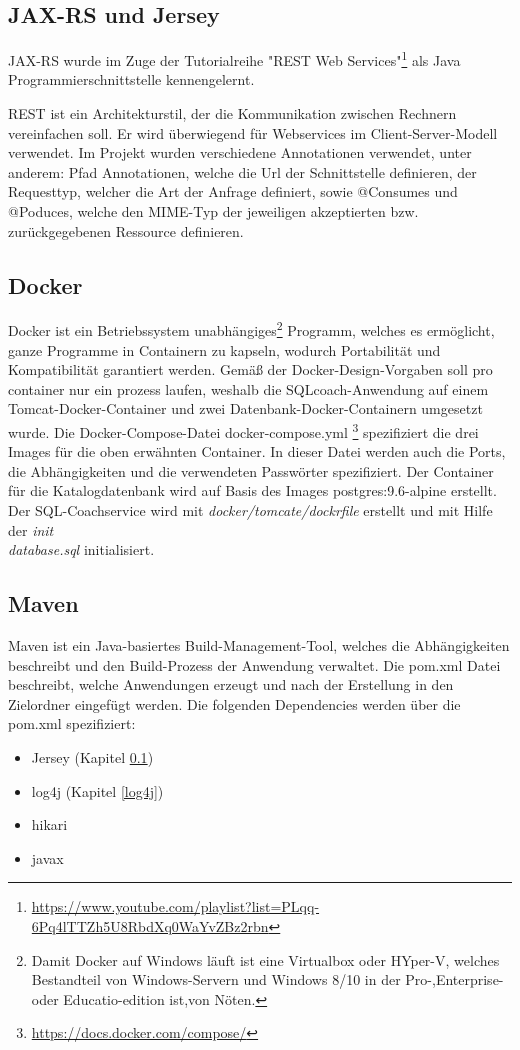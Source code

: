 \documentclass[fleqn,10pt,ngerman]{SelfArx}
\begin{document}
	
	\subsection{JAX-RS und Jersey}\label{JAX-RS und Jersey}
	JAX-RS wurde im Zuge der Tutorialreihe "REST Web Services"\footnote{\url{https://www.youtube.com/playlist?list=PLqq-6Pq4lTTZh5U8RbdXq0WaYvZBz2rbn}} als Java Programmierschnittstelle kennengelernt.
	
	\noindent REST ist ein Architekturstil, der die Kommunikation zwischen Rechnern vereinfachen soll.
	Er wird überwiegend für Webservices im Client-Server-Modell verwendet.
	Im Projekt wurden verschiedene Annotationen verwendet, unter anderem:\newline
	Pfad Annotationen, welche die Url der Schnittstelle definieren, der Requesttyp, welcher die Art der Anfrage definiert, sowie @Consumes und @Poduces, welche den MIME-Typ der jeweiligen akzeptierten bzw. zurückgegebenen Ressource definieren.
	\subsection{Docker}
	Docker  ist ein Betriebssystem unabhängiges\footnote{Damit Docker auf Windows läuft ist eine Virtualbox oder HYper-V, welches Bestandteil von Windows-Servern und Windows 8/10 in der Pro-,Enterprise- oder Educatio-edition ist,von Nöten.} Programm, welches es ermöglicht, ganze Programme in Containern zu kapseln, wodurch Portabilität und Kompatibilität garantiert werden. 
	Gemäß der Docker-Design-Vorgaben soll pro container nur ein prozess laufen, weshalb die SQLcoach-Anwendung auf einem Tomcat-Docker-Container und zwei Datenbank-Docker-Containern umgesetzt wurde. \newline
	Die Docker-Compose-Datei  docker-compose.yml \footnote{\url{https://docs.docker.com/compose/}}
	spezifiziert die drei Images für die  oben erwähnten Container. In dieser Datei werden auch die Ports, die Abhängigkeiten und die verwendeten Passwörter spezifiziert.
	Der Container für die Katalogdatenbank wird auf Basis des Images postgres:9.6-alpine erstellt. Der SQL-Coachservice wird mit \textit{docker/tomcate/dockrfile} erstellt und mit Hilfe der  \textit{init\\database.sql} initialisiert. 
	
	
	\subsection{Maven}
	Maven ist ein Java-basiertes Build-Management-Tool, welches die Abhängigkeiten beschreibt und den Build-Prozess der Anwendung verwaltet. Die pom.xml Datei beschreibt, welche Anwendungen erzeugt  und  nach der Erstellung in den Zielordner eingefügt werden.\newline
	Die folgenden Dependencies werden über die pom.xml spezifiziert:
	\begin{itemize}
		\item Jersey (Kapitel \ref{JAX-RS und Jersey})
		\item log4j	 (Kapitel \ref{log4j})
		\item hikari
		\item javax
	\end{itemize}
	\newpage
	
\end{document}
